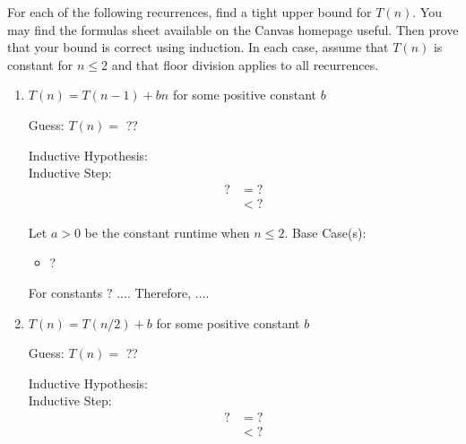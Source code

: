 \documentclass[11pt, letter]{article}
\begin{document}
For each of the following recurrences, find a tight upper bound for $T(n)$. You may find the formulas sheet available on the Canvas homepage useful. Then prove that your bound is correct using induction.  In each case, assume that $T(n)$ is constant for $n \leq 2$ and that floor division applies to all recurrences.
\vspace{\baselineskip}
\begin{enumerate}
\item $T(n) = T(n-1) + bn$ for some positive constant $b$\\

    \begin{center}
        Guess: $T(n) = $ ??\\
    \end{center}
    
    Inductive Hypothesis: \\
    Inductive Step:\\
    \begin{equation*}
        \begin{split}
            ? &= ?\\
            &< ?
        \end{split}
    \end{equation*}
    
    Let $a > 0$ be the constant runtime when $n\leq 2$. Base Case(s):
    \begin{itemize}
        \item ?
    \end{itemize}  
    
    For constants $?$ $...$. Therefore, $...$.\\
    
\item $T(n) = T(n/2) + b$ for some positive constant $b$\\

    \begin{center}
        Guess: $T(n) = $ ??\\
    \end{center}
    
    Inductive Hypothesis: \\
    Inductive Step:\\
    \begin{equation*}
        \begin{split}
            ? &= ?\\
            &< ?
        \end{split}
    \end{equation*}
    

\end{enumerate}
\end{document}
